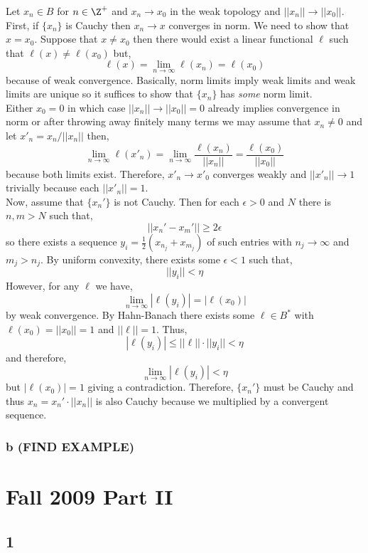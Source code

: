 \documentclass[12pt]{article}
\begin{document}
Let $x_n \in B$ for $n \in \Z^{+}$ and $x_n \to x_0$ in the weak topology and $||x_n|| \to ||x_0||$. 
\bigskip\\
First, if $\{ x_n \}$ is Cauchy then $x_n \to x$ converges in norm. We need to show that $x = x_0$. Suppose that $x \neq x_0$ then there would exist a linear functional $\ell$ such that $\ell(x) \neq \ell(x_0)$ but,
\[ \ell(x) = \lim_{n \to \infty} \ell(x_n) = \ell(x_0) \]
because of weak convergence. Basically, norm limits imply weak limits and weak limits are unique so it suffices to show that $\{ x_n \}$ has \textit{some} norm limit.
\bigskip\\
Either $x_0 = 0$ in which case $|| x_n || \to ||x_0|| = 0$ already implies convergence in norm or after throwing away finitely many terms we may assume that $x_n \neq 0$ and let $x'_n = x_n / || x_n ||$ then,
\[ \lim_{n \to \infty} \ell(x'_n) = \lim_{n \to \infty} \frac{\ell(x_n)}{|| x_n||} = \frac{\ell(x_0)}{||x_0||} \]
because both limits exist. Therefore, $x'_n \to x'_0$ converges weakly and $|| x'_n || \to 1$ trivially because each $|| x'_n || = 1$. 
\bigskip\\
Now, assume that $\{ x_n' \}$ is not Cauchy. Then for each $\epsilon > 0$ and $N$ there is $n,m > N$ such that,
\[ || x_n' - x_m' || \ge 2 \epsilon \]
so there exists a sequence $y_i = \tfrac{1}{2}(x_{n_j} + x_{m_j})$ of such entries with $n_j \to \infty$ and $m_j > n_j$. By uniform convexity, there exists some $\epsilon < 1$ such that,
\[ || y_i || < \eta \]
However, for any $\ell$ we have,
\[ \lim_{n \to \infty} | \ell(y_i)| = | \ell(x_0) | \]
by weak convergence. By Hahn-Banach there exists some $\ell \in B^*$ with $\ell(x_0) = || x_0 || = 1$ and $|| \ell || = 1$. Thus,
\[ | \ell(y_i) | \le || \ell || \cdot || y_i || < \eta \]
and therefore,
\[ \lim_{n \to \infty} | \ell(y_i) | < \eta \]
but $| \ell(x_0) | = 1$ giving a contradiction. Therefore, $\{ x_n' \}$ must be Cauchy and thus $x_n = x_n' \cdot || x_n ||$ is also Cauchy because we multiplied by a convergent sequence.

\subsubsection{b (FIND EXAMPLE)}



\section{Fall 2009 Part II}


\subsection{1}
\end{document}
